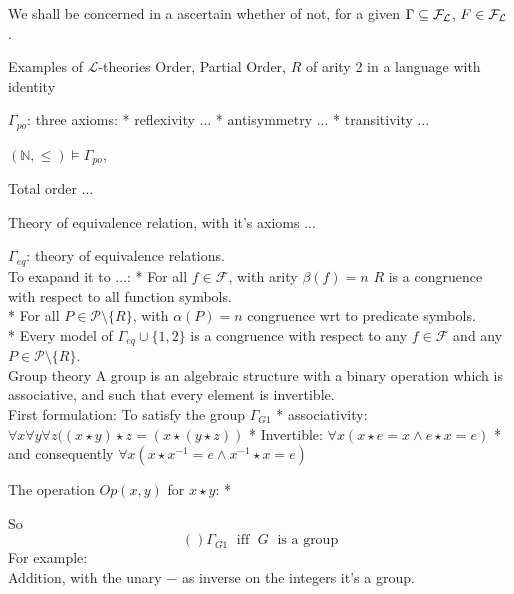 We shall be concerned in a ascertain whether of not, for a given $\Gamma \subseteq \mathcal{F}_\mathcal{L}$, $F \in \mathcal{F}_\mathcal{L}$.\\

\newpage

%
%
%



Examples of $\mathcal{L}$-theories
Order, Partial Order, $R$ of arity 2 in a language with identity

$\Gamma_{po}$: three axioms: %
* reflexivity ...
* antisymmetry ...
* transitivity ...

$(\mathbb{N}, \leq) \models \Gamma_{po}$, %

Total order ... %

Theory of equivalence relation, with it's axioms ...
$$ 
$$

$\Gamma_{eq}$: theory of equivalence relations.\\

To exapand it to ...:
* For all $f \in \mathcal{F}$, with arity $\beta(f) = n$
$R$ is a congruence with respect to all function symbols.\\

* For all $P \in \mathcal{P} \setminus \{R\}$, with $\alpha (P) = n$
congruence wrt to predicate symbols.\\

* Every model of $\Gamma_{eq} \cup \{1,2\}$ is a congruence with respect to any $f \in \mathcal{F}$ and any $P \in \mathcal{P} \setminus \{R\}$.\\

Group theory
A group is an algebraic structure with a binary operation which is associative, and such that every element is invertible.\\

First formulation: To satisfy the group $\Gamma_{G1}$
* associativity: $\forall x \forall y \forall z ((x \star y)\star z = (x \star (y \star z))$
* Invertible: $\forall x (x \star e = x \wedge e \star x = e)$
* and consequently $\forall x (x \star x^{-1} = e \wedge x^{-1} \star x = e)$

The operation $Op(x,y)$ for $x \star y$:
* %

So 
$$ () \Gamma_{G1} \; \text{ iff } \; G \; \text{ is a group} 
$$
For example: %
$$ $$
Addition, with the unary $-$ as inverse on the integers it's a group.\\

